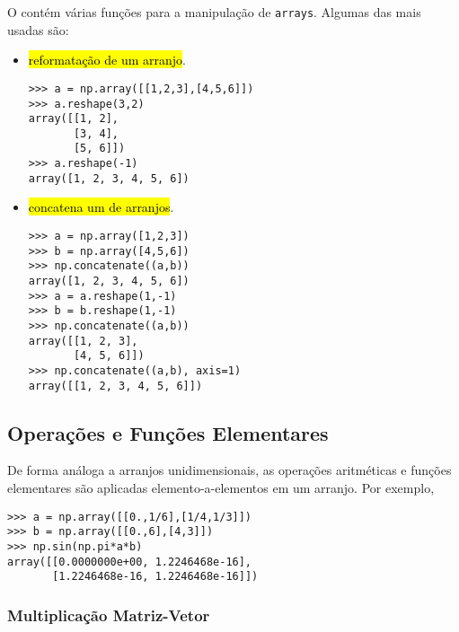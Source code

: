O {\numpy} contém várias funções para a manipulação de \texttt{arrays}. Algumas das mais usadas são:
\begin{itemize}
\item {\PYTHONnumpyDOTreshape} \hl{reformatação de um arranjo}.

\begin{lstlisting}[xrightmargin=2.5em]
>>> a = np.array([[1,2,3],[4,5,6]])
>>> a.reshape(3,2)
array([[1, 2],
       [3, 4],
       [5, 6]])
>>> a.reshape(-1)
array([1, 2, 3, 4, 5, 6])
\end{lstlisting}

\item {\PYTHONnumpyDOTconcatenate} \hl{concatena um {\PYTHONtuple} de arranjos}.

\begin{lstlisting}[xrightmargin=2.5em]
>>> a = np.array([1,2,3])
>>> b = np.array([4,5,6])
>>> np.concatenate((a,b))
array([1, 2, 3, 4, 5, 6])
>>> a = a.reshape(1,-1)
>>> b = b.reshape(1,-1)
>>> np.concatenate((a,b))
array([[1, 2, 3],
       [4, 5, 6]])
>>> np.concatenate((a,b), axis=1)
array([[1, 2, 3, 4, 5, 6]])
\end{lstlisting}

\end{itemize}

\subsection{Operações e Funções Elementares}

De forma análoga a arranjos unidimensionais, as operações aritméticas e funções elementares são aplicadas elemento-a-elementos em um arranjo. Por exemplo,

\begin{lstlisting}
>>> a = np.array([[0.,1/6],[1/4,1/3]])
>>> b = np.array([[0.,6],[4,3]])
>>> np.sin(np.pi*a*b)
array([[0.0000000e+00, 1.2246468e-16],
       [1.2246468e-16, 1.2246468e-16]])
\end{lstlisting}

\subsubsection{Multiplicação Matriz-Vetor}

